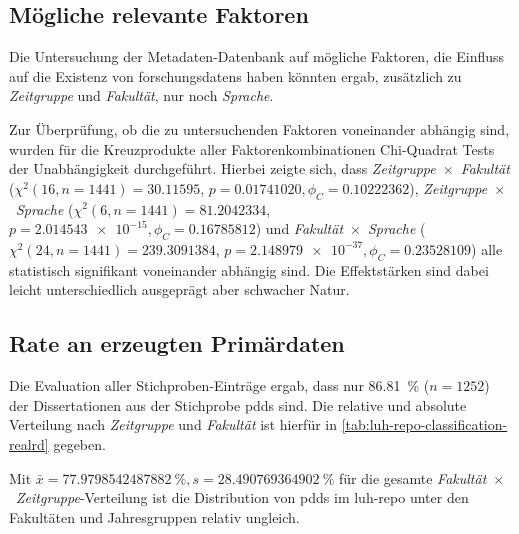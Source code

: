 \subsection{Mögliche relevante Faktoren}\label{sec:luh-repo-results-factors}
Die Untersuchung der Metadaten-Datenbank auf mögliche Faktoren, die Einfluss auf die Existenz von \glspl{forschungsdaten} haben könnten ergab, zusätzlich zu \textit{Zeitgruppe} und \textit{Fakultät}, nur noch \textit{Sprache}.

Zur Überprüfung, ob die zu untersuchenden Faktoren voneinander abhängig sind, wurden für die Kreuzprodukte aller Faktorenkombinationen Chi-Quadrat Tests der Unabhängigkeit durchgeführt.
Hierbei zeigte sich, dass \textit{Zeitgruppe}~$\times$~\textit{Fakultät} ($\chi^2 (\num{16}, n=\num{1441}) = \num[round-mode=places,round-precision=2]{30.11595}$, $p = \num[round-mode=places,round-precision=2]{0.01741020},\phi_C=\num[round-mode=places,round-precision=2]{0.10222362}$), \textit{Zeitgruppe}~$\times$~\textit{Sprache} ($\chi^2 (\num{6}, n=\num{1441}) = \num[round-mode=places,round-precision=2]{81.2042334}$, $p = \num[round-mode=places,round-precision=2]{2.014543e-15}, \phi_C=\num[round-mode=places,round-precision=2]{0.16785812}$) und \textit{Fakultät}~$\times$~\textit{Sprache} ($\chi^2 (\num{24}, n=\num{1441}) = \num[round-mode=places,round-precision=2]{239.3091384}$, $p = \num[round-mode=places,round-precision=2]{2.148979e-37},\phi_C=\num[round-mode=places,round-precision=2]{0.23528109}$) alle statistisch signifikant voneinander abhängig sind.
Die Effektstärken sind dabei leicht unterschiedlich ausgeprägt aber schwacher Natur.

\subsection{Rate an erzeugten Primärdaten}\label{sec:luh-repo-results-pd}
Die Evaluation aller Stichproben-Einträge ergab, dass nur \SI[round-mode=places,round-precision=2]{86,81}{\percent} ($n=\num{1252}$) der Dissertationen aus der Stichprobe \glspl{pdd} sind.
Die relative und absolute Verteilung nach \textit{Zeitgruppe} und \textit{Fakultät} ist hierfür in \cref{tab:luh-repo-classification-realrd} gegeben.
\begin{table}[!htbp]
	\caption{Anteil an \glspl{pdd} aus der Stichprobe.
    Angaben relativ zu der respektiven \textit{Fakultät}~$\times$~\textit{Zeitgruppe}-Gesamtanzahl.
    Absolute Werte in Klammern angegeben.}
    
    \label{tab:luh-repo-classification-realrd}
\end{table}
Mit $\bar{x}=\SI[round-mode=places,round-precision=2]{77.9798542487882}{\percent},s=\SI[round-mode=places,round-precision=2]{28.490769364902}{\percent}$ für die gesamte \textit{Fakultät}~$\times$~\textit{Zeitgruppe}-Verteilung ist die Distribution von \glspl{pdd} im \gls{luh-repo} unter den Fakultäten und Jahresgruppen relativ ungleich.


